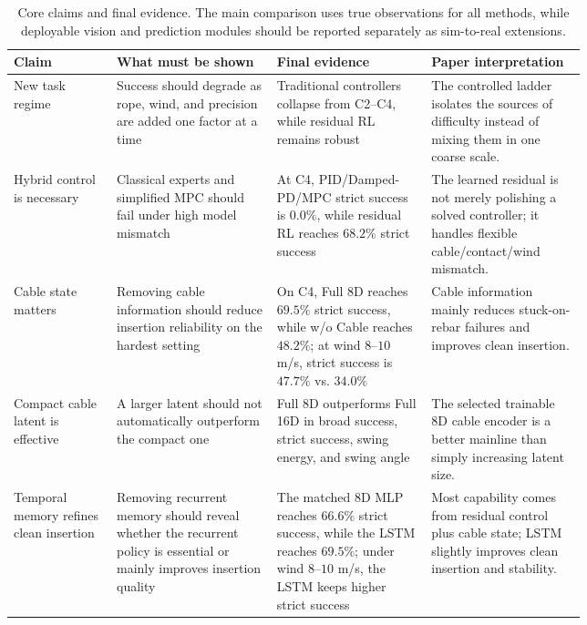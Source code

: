 \documentclass[10pt]{article}
\begin{document}
\begin{table}[t]
\centering
\caption{Core claims and final evidence.  The main comparison uses true observations for all methods, while deployable vision and prediction modules should be reported separately as sim-to-real extensions.}
\label{tab:claims_to_results}
\footnotesize
\begin{tabularx}{\linewidth}{@{}p{0.18\linewidth}p{0.28\linewidth}p{0.27\linewidth}Y@{}}
\toprule
Claim & What must be shown & Final evidence & Paper interpretation \\
\midrule
New task regime & Success should degrade as rope, wind, and precision are added one factor at a time & Traditional controllers collapse from C2--C4, while residual RL remains robust & The controlled ladder isolates the sources of difficulty instead of mixing them in one coarse scale. \\
Hybrid control is necessary & Classical experts and simplified MPC should fail under high model mismatch & At C4, PID/Damped-PD/MPC strict success is $0.0\%$, while residual RL reaches $68.2\%$ strict success & The learned residual is not merely polishing a solved controller; it handles flexible cable/contact/wind mismatch. \\
Cable state matters & Removing cable information should reduce insertion reliability on the hardest setting & On C4, Full 8D reaches $69.5\%$ strict success, while w/o Cable reaches $48.2\%$; at wind $8$--$10$ m/s, strict success is $47.7\%$ vs. $34.0\%$ & Cable information mainly reduces stuck-on-rebar failures and improves clean insertion. \\
Compact cable latent is effective & A larger latent should not automatically outperform the compact one & Full 8D outperforms Full 16D in broad success, strict success, swing energy, and swing angle & The selected trainable 8D cable encoder is a better mainline than simply increasing latent size. \\
Temporal memory refines clean insertion & Removing recurrent memory should reveal whether the recurrent policy is essential or mainly improves insertion quality & The matched 8D MLP reaches $66.6\%$ strict success, while the LSTM reaches $69.5\%$; under wind $8$--$10$ m/s, the LSTM keeps higher strict success & Most capability comes from residual control plus cable state; LSTM slightly improves clean insertion and stability. \\
\bottomrule
\end{tabularx}
\end{table}
\end{document}
